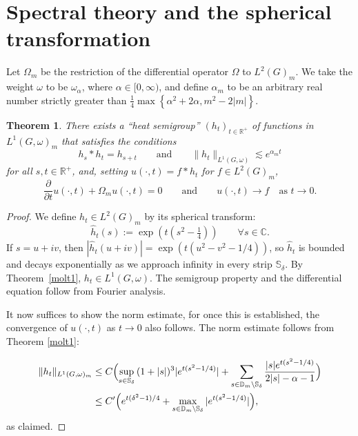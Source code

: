 \documentclass[12pt,a4paper]{amsart}
\newtheorem{thm}{Theorem}[section]
\theoremstyle{definition}
\theoremstyle{remark}
\numberwithin{equation}{section}
\newcommand{\R}{\mathbb{R}}
\newcommand{\C}{\mathbb{C}}
\newcommand{\Strip}{\mathbb{S}}
\newcommand{\Discr}{\mathbb{D}_m}
\newcommand{\var}{s}
\begin{document}
\color{black}
\section{Spectral theory and the spherical transformation}

Let $\Omega_m$ be the restriction of the differential operator $\Omega$ to $L^2(G)_m$.
We take the weight $\omega$ to be $\omega_\alpha$, where $\alpha \in [0,\infty)$, and define   
$\alpha_m$ to be an arbitrary real number strictly greater than 
$\tfrac14 \max \left\{ \alpha^2 +2\alpha , m^2 -2 |m| \right\}$.

\begin{thm}\label{thm:heat-kernels}
There exists a ``heat semigroup'' $(h_t)_{t\in\R^+}$ of functions  in $L^1(G,\omega)_m$ that satisfies the conditions
\[
h_s * h_t = h_{s+t} 
\qquad\text{and}\qquad
\| h_t \|_{L^1(G,\omega)}  \lesssim e^{\alpha_m t} 
\]
for all $s, t \in \R^+$, and, setting $u(\cdot,t) = f * h_t$ for $f \in L^2(G)_m$,
\[
\frac{\partial}{\partial t} u(\cdot,t) + \Omega_m u(\cdot,t) = 0
\qquad\text{and}\qquad
u(\cdot,t) \to f \quad\text{as $t \to 0$}.
\]
\end{thm}

\begin{proof}
We define $h_t \in L^2(G)_m$ by its spherical transform: 
\[
\hat h_t (\var) := \exp( t ( \var^2 - \tfrac{1}{4}) ) 
\qquad\forall \var \in \C . 
\]
If $\var = u + iv$, then $| \hat h_t(u+iv) | = \exp (t(u^2 - v^2 -1/4 ))$, so $\hat h_t$ is bounded  and decays exponentially as we approach infinity in every strip $\Strip_\delta$.
By Theorem~\ref{molt1},  $h_t \in L^1(G,\omega)$.
The semigroup property and the differential equation follow from Fourier analysis.

It now suffices to show the norm estimate, for once this is established, the convergence of $u(\cdot ,t)$ as $t \to 0$ also follows.
The norm estimate follows from Theorem \ref{molt1}:

\begin{align*}
\| h_t \|_{L^1(G,\omega)_m} 
&\leq C \Bigl( \sup_{\var \in \Strip_\delta}\,(1+|\var |)^{3} |  e^{t(\var^2 - 1/4) } |
+  \sum_{\var\in \Discr\setminus \Strip_\delta} \frac{|\var|  e^{t(\var^2 - 1/4) }}{2|\var|-\alpha -1}\Bigr) \\
&\leq C' \Bigl(    e^{t(\delta^2 - 1)/4 } 
+  \max_{\var\in \Discr\setminus \Strip_\delta}   | e^{t(\var^2 - 1/4) } | \Bigr) ,
\end{align*}
as claimed.
\end{proof}
\end{document}
